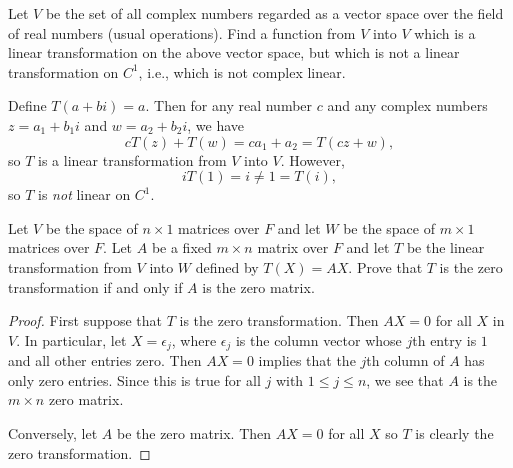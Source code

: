  Let $V$ be the set of all complex numbers regarded as a
vector space over the field of real numbers (usual operations). Find a
function from $V$ into $V$ which is a linear transformation on the
above vector space, but which is not a linear transformation on $C^1$,
i.e., which is not complex linear.
\begin{solution}
  Define $T(a + bi) = a$. Then for any real number $c$ and any
  complex numbers $z = a_1 + b_1i$ and $w = a_2 + b_2i$, we have
  \begin{equation*}
    cT(z) + T(w) = ca_1 + a_2 = T(cz + w),
  \end{equation*}
  so $T$ is a linear transformation from $V$ into $V$. However,
  \begin{equation*}
    iT(1) = i \neq 1 = T(i),
  \end{equation*}
  so $T$ is {\em not} linear on $C^1$.
\end{solution}

 Let $V$ be the space of $n\times1$ matrices over $F$ and
let $W$ be the space of $m\times1$ matrices over $F$. Let $A$ be a
fixed $m\times n$ matrix over $F$ and let $T$ be the linear
transformation from $V$ into $W$ defined by $T(X) = AX$. Prove that
$T$ is the zero transformation if and only if $A$ is the zero matrix.
\begin{proof}
  First suppose that $T$ is the zero transformation. Then $AX = 0$ for
  all $X$ in $V$. In particular, let $X = \epsilon_j$, where
  $\epsilon_j$ is the column vector whose $j$th entry is $1$ and all
  other entries zero. Then $AX = 0$ implies that the $j$th column of
  $A$ has only zero entries. Since this is true for all $j$ with
  $1\leq j\leq n$, we see that $A$ is the $m\times n$ zero matrix.

  Conversely, let $A$ be the zero matrix. Then $AX = 0$ for all $X$ so
  $T$ is clearly the zero transformation.
\end{proof}
